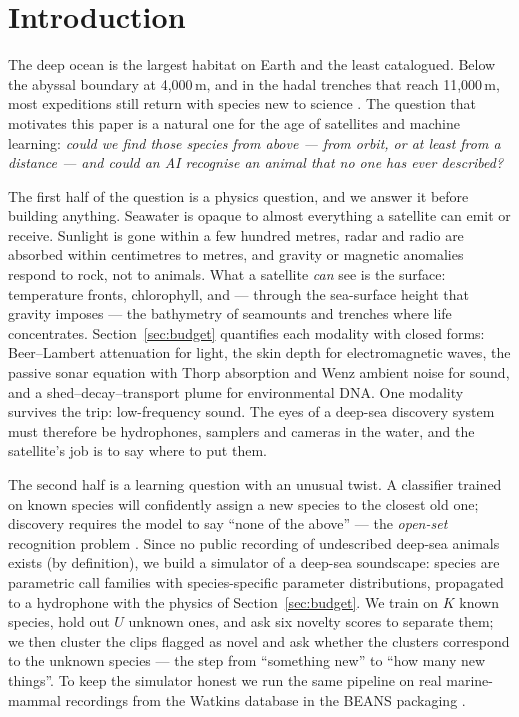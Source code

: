 \section{Introduction}
\label{sec:intro}

The deep ocean is the largest habitat on Earth and the least catalogued. Below
the abyssal boundary at 4,000\,m, and in the hadal trenches that reach
11,000\,m, most expeditions still return with species new to science
\cite{ramirez2010deep}. The question that motivates this paper is a natural
one for the age of satellites and machine learning: \emph{could we find those
species from above --- from orbit, or at least from a distance --- and could an
AI recognise an animal that no one has ever described?}

The first half of the question is a physics question, and we answer it before
building anything. Seawater is opaque to almost everything a satellite can
emit or receive. Sunlight is gone within a few hundred metres, radar and radio
are absorbed within centimetres to metres, and gravity or magnetic anomalies
respond to rock, not to animals. What a satellite \emph{can} see is the
surface: temperature fronts, chlorophyll, and --- through the sea-surface
height that gravity imposes --- the bathymetry of seamounts and trenches where
life concentrates. Section~\ref{sec:budget} quantifies each modality with
closed forms: Beer--Lambert attenuation for light, the skin depth for
electromagnetic waves, the passive sonar equation with Thorp absorption and
Wenz ambient noise for sound, and a shed--decay--transport plume for
environmental DNA. One modality survives the trip: low-frequency sound. The
eyes of a deep-sea discovery system must therefore be hydrophones, samplers
and cameras in the water, and the satellite's job is to say where to put
them.

The second half is a learning question with an unusual twist. A classifier
trained on known species will confidently assign a new species to the closest
old one; discovery requires the model to say ``none of the above'' --- the
\emph{open-set} recognition problem \cite{hendrycks2017baseline,
lee2018simple, liu2020energy, sun2022knn}. Since no public recording of
undescribed deep-sea animals exists (by definition), we build a simulator of a
deep-sea soundscape: species are parametric call families with
species-specific parameter distributions, propagated to a hydrophone with the
physics of Section~\ref{sec:budget}. We train on $K$ known species, hold out
$U$ unknown ones, and ask six novelty scores to separate them; we then cluster
the clips flagged as novel and ask whether the clusters correspond to the
unknown species --- the step from ``something new'' to ``how many new
things''. To keep the simulator honest we run the same pipeline on real
marine-mammal recordings from the Watkins database in the BEANS packaging
\cite{hagiwara2022beans}.

